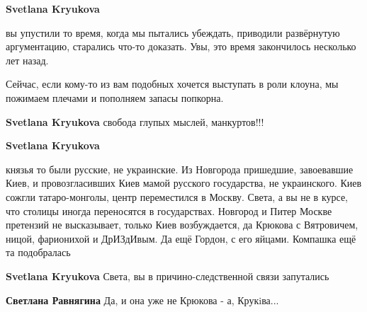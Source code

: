 \begin{itemize}
\begin{itemize}
\textbf{Svetlana Kryukova} 

вы упустили то время, когда мы пытались убеждать, приводили развёрнутую
аргументацию, старались что-то доказать. Увы, это время закончилось несколько
лет назад.

Сейчас, если кому-то из вам подобных хочется выступать в роли клоуна, мы
пожимаем плечами и пополняем запасы попкорна.


 
\textbf{Svetlana Kryukova} свобода глупых мыслей, манкуртов!!!


 
\textbf{Svetlana Kryukova} 

князья то были русские, не украинские. Из Новгорода пришедшие, завоевавшие
Киев, и провозгласивших Киев мамой русского государства, не украинского. Киев
сожгли татаро-монголы, центр переместился в Москву. Света, а вы не в курсе, что
столицы иногда переносятся в государствах. Новгород и Питер Москве претензий не
высказывает, только Киев возбуждается, да Крюкова с Вятровичем, ницой,
фарионихой и ДрИЗдИвым. Да ещё Гордон, с его яйцами. Компашка ещё та
подобралась

 
\textbf{Svetlana Kryukova} Света, вы в причино-следственной связи запутались

 
\textbf{Светлана Равнягина} Да, и она уже не Крюкова - а, Крукiва...\Laughey[1.0][white]

 

\end{itemize}
\end{itemize}
